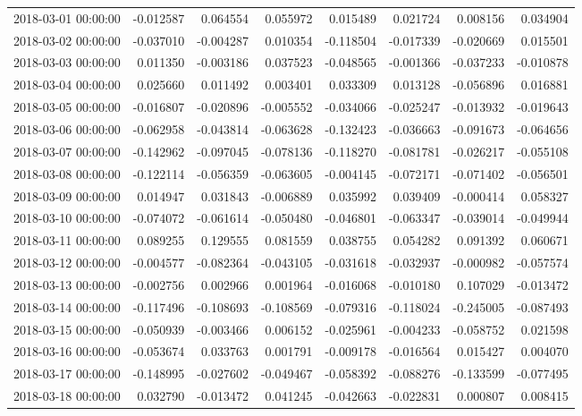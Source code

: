 \begin{tabular}{lrrrrrrr}
2018-03-01 00:00:00 & -0.012587 & 0.064554 & 0.055972 & 0.015489 & 0.021724 & 0.008156 & 0.034904 \\
2018-03-02 00:00:00 & -0.037010 & -0.004287 & 0.010354 & -0.118504 & -0.017339 & -0.020669 & 0.015501 \\
2018-03-03 00:00:00 & 0.011350 & -0.003186 & 0.037523 & -0.048565 & -0.001366 & -0.037233 & -0.010878 \\
2018-03-04 00:00:00 & 0.025660 & 0.011492 & 0.003401 & 0.033309 & 0.013128 & -0.056896 & 0.016881 \\
2018-03-05 00:00:00 & -0.016807 & -0.020896 & -0.005552 & -0.034066 & -0.025247 & -0.013932 & -0.019643 \\
2018-03-06 00:00:00 & -0.062958 & -0.043814 & -0.063628 & -0.132423 & -0.036663 & -0.091673 & -0.064656 \\
2018-03-07 00:00:00 & -0.142962 & -0.097045 & -0.078136 & -0.118270 & -0.081781 & -0.026217 & -0.055108 \\
2018-03-08 00:00:00 & -0.122114 & -0.056359 & -0.063605 & -0.004145 & -0.072171 & -0.071402 & -0.056501 \\
2018-03-09 00:00:00 & 0.014947 & 0.031843 & -0.006889 & 0.035992 & 0.039409 & -0.000414 & 0.058327 \\
2018-03-10 00:00:00 & -0.074072 & -0.061614 & -0.050480 & -0.046801 & -0.063347 & -0.039014 & -0.049944 \\
2018-03-11 00:00:00 & 0.089255 & 0.129555 & 0.081559 & 0.038755 & 0.054282 & 0.091392 & 0.060671 \\
2018-03-12 00:00:00 & -0.004577 & -0.082364 & -0.043105 & -0.031618 & -0.032937 & -0.000982 & -0.057574 \\
2018-03-13 00:00:00 & -0.002756 & 0.002966 & 0.001964 & -0.016068 & -0.010180 & 0.107029 & -0.013472 \\
2018-03-14 00:00:00 & -0.117496 & -0.108693 & -0.108569 & -0.079316 & -0.118024 & -0.245005 & -0.087493 \\
2018-03-15 00:00:00 & -0.050939 & -0.003466 & 0.006152 & -0.025961 & -0.004233 & -0.058752 & 0.021598 \\
2018-03-16 00:00:00 & -0.053674 & 0.033763 & 0.001791 & -0.009178 & -0.016564 & 0.015427 & 0.004070 \\
2018-03-17 00:00:00 & -0.148995 & -0.027602 & -0.049467 & -0.058392 & -0.088276 & -0.133599 & -0.077495 \\
2018-03-18 00:00:00 & 0.032790 & -0.013472 & 0.041245 & -0.042663 & -0.022831 & 0.000807 & 0.008415 \\

\end{tabular}
